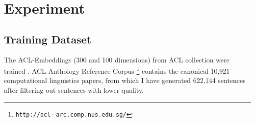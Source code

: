 \documentclass[11pt]{llncs}
\begin{document}




\section{Experiment}
\label{sec:Experiment}

\subsection{Training Dataset}\label{sec:trainingdataset}

The ACL-Embeddings (300 and 100 dimensions) from ACL collection were trained . ACL Anthology Reference Corpus \footnote{\footnotesize{\tt http://acl$-$arc.comp.nus.edu.sg/}} contains the canonical 10,921 computational linguistics papers, from which I have generated 622,144 sentences after filtering out sentences with lower quality.  
\end{document}
